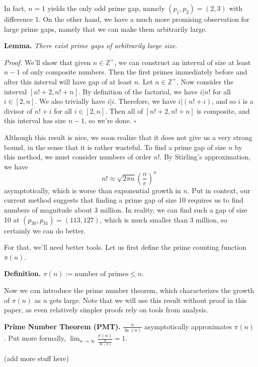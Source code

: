 \documentclass[conference]{IEEEtran}
\begin{document}
In fact, $n = 1$ yields the only odd prime gap, namely
$(p_1, p_2) = (2, 3)$ with difference 1. On the other
hand, we have a much more promising observation for large
prime gaps, namely that we can make them arbitrarily large.

\noindent
\textbf{Lemma.} \textit{There exist prime gaps of arbitrarily
large size.}

\noindent
\textit{Proof.} We'll show that given $n \in \mathbb{Z}^+$, we
can construct an interval of size at least $n - 1$ of only
composite numbers. Then the first primes immediately before
and after this interval will have gap of at least $n$.
\newline\indent
Let $n \in \mathbb{Z}^+$. Now consider the interval
$[n! + 2, n! + n]$. By definition of the
factorial, we have $i|n!$ for all $i \in [2, n]$. We also
trivially have $i|i$. Therefore, we have $i|(n! + i)$, and
so $i$ is a divisor of $n! + i$ for all $i \in [2, n]$.
Then all of $[n! + 2, n! + n]$ is composite, and this
interval has size $n - 1$, so we're done. \hfill$\square$

Although this result is nice, we soon realize that it does
not give us a very strong bound, in the sense that it is
rather wasteful. To find a prime gap of
size $n$ by this method, we must consider numbers of order
$n!$. By Stirling's approximation, we have
\[n! \approx \sqrt{2\pi n} \left(\frac{n}{e}\right)^n\]
asymptotically, which is worse than exponential growth in $n$.
Put in context, our current method suggests that finding
a prime gap of size 10 requires us to find numbers
of magnitude about 3 million. In reality, we can find such a
gap of size 10 at $(p_{30}, p_{31}) = (113, 127)$, which is
much smaller than 3 million, so certainly we can
do better.

For that, we'll need better tools. Let us first define
the prime counting function $\pi(n)$.

\noindent
\textbf{Definition.} $\pi(n) := \text{number of primes} \le n.$

Now we can introduce the prime number theorem,
which characterizes the growth of $\pi(n)$ as $n$ gets large.
Note that we will use this result without proof in this paper,
as even relatively simpler proofs rely on tools from
analysis.

\noindent
\textbf{Prime Number Theorem (PMT).}
$\frac{n}{\ln(n)}$ asymptotically approximates $\pi(n)$.
Put more formally,
$\displaystyle \lim_{n \to \infty} \frac{\pi(n)}{\frac{n}{\ln(n)}} = 1$.

(add more stuff here)
\end{document}
